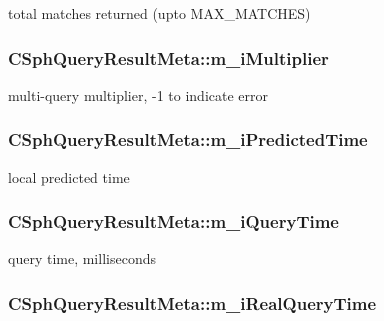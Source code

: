 total matches returned (upto M\-A\-X\-\_\-\-M\-A\-T\-C\-H\-E\-S) 

\hypertarget{classCSphQueryResultMeta_ab678890016913938bb758c98a6b403dc}{
\subsubsection[{m\-\_\-i\-Multiplier}]{ C\-Sph\-Query\-Result\-Meta\-::m\-\_\-i\-Multiplier}}\label{classCSphQueryResultMeta_ab678890016913938bb758c98a6b403dc}


multi-\/query multiplier, -\/1 to indicate error 

\hypertarget{classCSphQueryResultMeta_acf3a3a1f20860124b5d6416ee8bc4a50}{
\subsubsection[{m\-\_\-i\-Predicted\-Time}]{ C\-Sph\-Query\-Result\-Meta\-::m\-\_\-i\-Predicted\-Time}}\label{classCSphQueryResultMeta_acf3a3a1f20860124b5d6416ee8bc4a50}


local predicted time 

\hypertarget{classCSphQueryResultMeta_ad22d20d59f9daf6ba72e70bdae3fe170}{
\subsubsection[{m\-\_\-i\-Query\-Time}]{ C\-Sph\-Query\-Result\-Meta\-::m\-\_\-i\-Query\-Time}}\label{classCSphQueryResultMeta_ad22d20d59f9daf6ba72e70bdae3fe170}


query time, milliseconds 

\hypertarget{classCSphQueryResultMeta_aa9ad268e281a104663adbc6bc1370d9a}{
\subsubsection[{m\-\_\-i\-Real\-Query\-Time}]{ C\-Sph\-Query\-Result\-Meta\-::m\-\_\-i\-Real\-Query\-Time}}\label{classCSphQueryResultMeta_aa9ad268e281a104663adbc6bc1370d9a}


